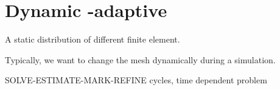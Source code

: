 \chapter{Dynamic \hp-adaptive }
\label{ch:dynamic}

A static distribution of different finite element.

Typically, we want to change the mesh dynamically during a simulation.

SOLVE-ESTIMATE-MARK-REFINE cycles, time dependent problem


